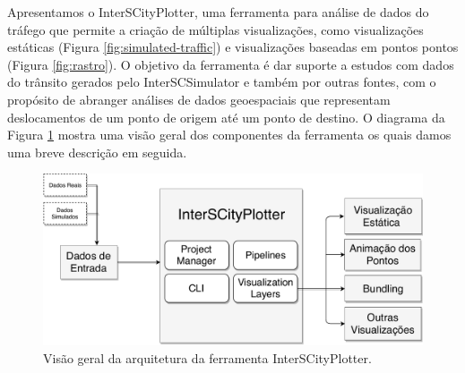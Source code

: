   Apresentamos o InterSCityPlotter, uma ferramenta para análise de dados do
tráfego que permite a criação de múltiplas visualizações, como visualizações
estáticas (Figura \ref{fig:simulated-traffic}) e visualizações baseadas em
pontos pontos (Figura \ref{fig:rastro}).  O objetivo da ferramenta é dar
suporte a estudos com dados do trânsito gerados pelo InterSCSimulator e também
por outras fontes, com o propósito de abranger análises de dados geoespaciais
que representam deslocamentos de um ponto de origem até um ponto de destino. O
diagrama da Figura \ref{fig:interscityplotter} mostra uma visão geral dos
componentes da ferramenta os quais damos uma breve descrição em seguida.

\begin{figure}[!htb]
  \centering
  \includegraphics[width=1\textwidth]{../figuras/interscityplotter.pdf}
  \caption{Visão geral da arquitetura da ferramenta InterSCityPlotter.}
  \label{fig:interscityplotter}
\end{figure}

